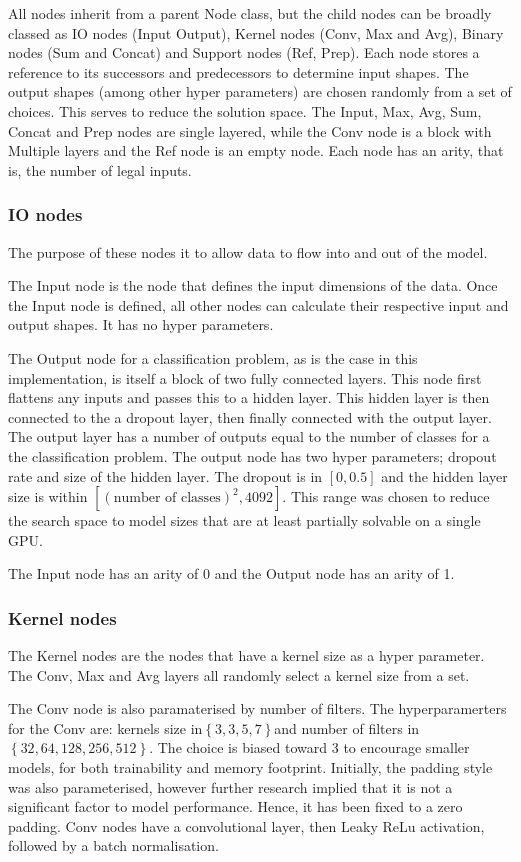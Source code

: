     All nodes inherit from a parent Node class, but the child nodes can be broadly classed as IO nodes (Input Output), Kernel nodes (Conv, Max and Avg), Binary nodes (Sum and Concat) and Support nodes (Ref, Prep). Each node stores a reference to its successors and predecessors to determine input shapes. The output shapes (among other hyper parameters) are chosen randomly from a set of choices. This serves to reduce the solution space. The Input, Max, Avg, Sum, Concat and Prep nodes are single layered, while the Conv node is a block with Multiple layers and the Ref node is an empty node. Each node has an arity, that is, the number of legal inputs.



    \subsubsection{IO nodes}
The purpose of these nodes it to allow data to flow into and out of the model.

The Input node is the node that defines the input dimensions of the data. Once the Input node is defined, all other nodes can calculate their respective input and output shapes. It has no hyper parameters.

The Output node for a classification problem, as is the case in this implementation, is itself a block of two fully connected layers. This node first flattens any inputs and passes this to a hidden layer. This hidden layer is then connected to the a dropout layer, then finally connected with the output layer. The output layer has a number of outputs equal to the number of classes for a the classification problem. The output node has two hyper parameters; dropout rate and size of the hidden layer. The dropout is in $[0, 0.5]$ and the hidden layer size is within $[(\text{number of classes})^{2}, 4092]$. This range was chosen to reduce the search space to model sizes that are at least partially solvable on a single GPU.

The Input node has an arity of 0 and the Output node has an arity of 1.


\subsubsection{Kernel nodes}
The Kernel nodes are the nodes that have a kernel size as a hyper parameter. The Conv, Max and Avg layers all randomly select a kernel size from a set.

The Conv node is also paramaterised by number of filters. The hyperparamerters for the Conv are: kernels size in$ \left\{ 3, 3, 5, 7 \right\} $and number of filters in $\left\{ 32, 64, 128, 256, 512 \right\}$. The choice is biased toward 3 to encourage smaller models, for both trainability and memory footprint. Initially, the padding style was also parameterised, however further research implied that it is not a significant factor to model performance. Hence, it has been fixed to a zero padding. Conv nodes have a convolutional layer, then  Leaky ReLu activation, followed by a batch normalisation.

